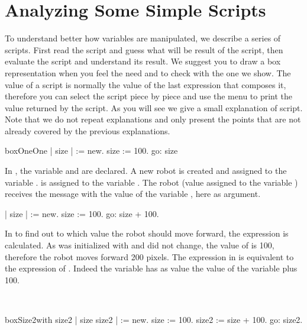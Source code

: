 \section{Analyzing Some Simple Scripts}
To  understand better how variables are manipulated, we describe a series of scripts. First read the script and guess what will be result of the script, then evaluate the script and understand its result. We suggest you to draw a box representation when you feel the need and to check with the one we show. The value of a script is normally the value of the last expression that composes it, therefore you can select the script piece by piece and use the  menu to print the value returned by the script.  As you will see we give a small explanation of script. Note that we do not repeat explanations and  only present the points that are not already covered by the previous explanations. 

\begin{scriptfig}{boxOne}{One}\label{scr:vardeepone}
| \caro size |                
\caro := \Turtle new.
size := 100.     
\caro go: size
\end{scriptfig}

In , the variable \caro and  are declared. A new robot is created and assigned to the variable \caro.  is assigned to the variable . The robot (value assigned to the variable \caro) receives the message  with the value of the variable , here  as argument.

\begin{scriptwithouttitle}\label{scr:vardeeptwo}
| \caro size |                
\caro := \Turtle new.
size := 100.	
\caro go: size + 100.
\end{scriptwithouttitle}

In  to find out  to which value the robot should move forward, the expression  is calculated. As  was initialized with  and did not change, the value of  is 100, therefore the robot moves forward 200 pixels.
The expression  in  is equivalent to the expression  of . Indeed the variable  has as value the value of the variable  plus 100. \ 

\ 

\begin{scriptfig}[0.45]{boxSize2}{with size2}\label{scr:vardeepthree}
| \caro size size2 |                
\caro := \Turtle new.
size := 100.
size2 := size + 100.
\caro go: size2.
\end{scriptfig}

